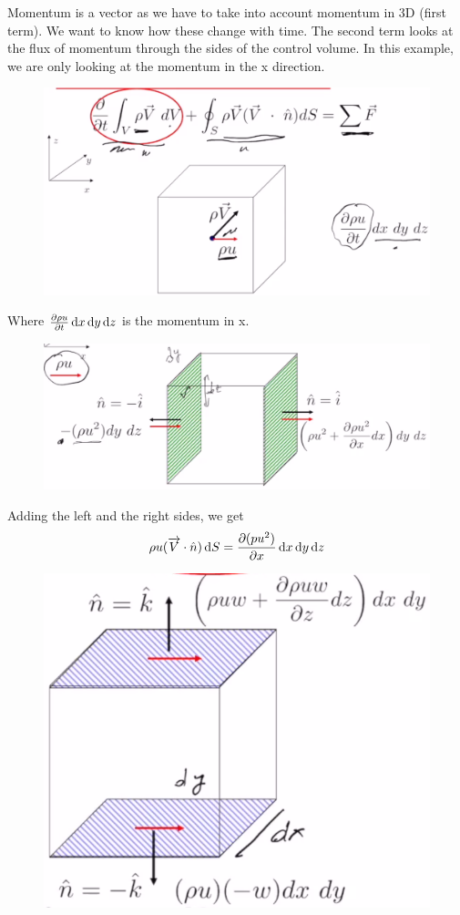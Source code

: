 \documentclass[class=report, crop=false, 12pt,a4paper]{standalone}
\begin{document}
Momentum is a vector as we have to take into account momentum in 3D (first term). We want to know how these change with time. The second term looks at the flux of momentum through the sides of the control volume. In this example, we are only looking at the momentum in the x direction. 
\begin{figure}[H]
  \centering
  \includegraphics[width = 0.8 \textwidth]{../img/momentuminx.png}
\end{figure}
Where $\frac{\partial \rho u}{\partial t} \dif x \dif y \dif z$ is the momentum in x.
\begin{figure}[H]
  \centering
  \includegraphics[width = 0.8 \textwidth]{../img/fluxinx.png}
\end{figure}
Adding the left and the right sides, we get
\begin{equation}
  \rho u (\overrightarrow{V} \cdot \hat{n}) \dif S = \frac{\partial (p u^2)}{\partial x} \dif x \dif y \dif z
\end{equation}
\begin{figure}[H]
  \centering
  \includegraphics[width = 0.6 \textwidth]{../img/fluxthroughxy.png}
\end{figure}
\end{document}
